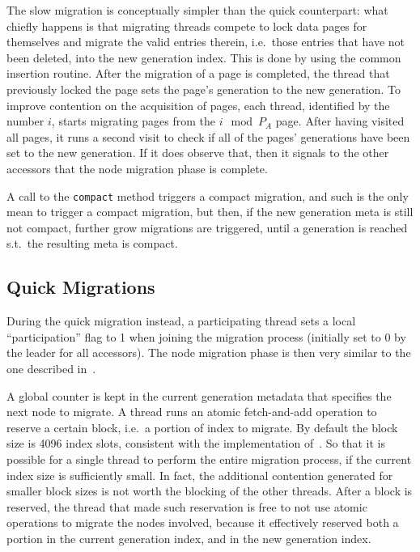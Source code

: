 The slow migration is conceptually simpler than the quick counterpart: what chiefly happens is that migrating threads compete to lock data pages for themselves and migrate the valid entries therein, i.e.\ those entries that have not been deleted, into the new generation index.
This is done by using the common insertion routine.
After the migration of a page is completed, the thread that previously locked the page sets the page's generation to the new generation.
To improve contention on the acquisition of pages, each thread, identified by the number $i$, starts migrating pages from the $i \mod P_A$ page.
After having visited all pages, it runs a second visit to check if all of the pages' generations have been set to the new generation.
If it does observe that, then it signals to the other accessors that the node migration phase is complete.

A call to the \texttt{compact} method triggers a compact migration, and such is the only mean to trigger a compact migration, but then, if the new generation meta is still not compact, further grow migrations are triggered, until a generation is reached s.t.\ the resulting meta is compact.


\subsection{Quick Migrations}\label{subsec:quick-migrations}
During the quick migration instead, a participating thread sets a local ``participation'' flag to 1 when joining the migration process (initially set to 0 by the leader for all accessors).
The node migration phase is then very similar to the one described in~\cite[\S5.3.1]{maier}.

A global counter is kept in the current generation metadata that specifies the next node to migrate.
A thread runs an atomic fetch-and-add operation to reserve a certain block, i.e.\ a portion of index to migrate.
By default the block size is 4096 index slots, consistent with the implementation of~\cite{maier}.
So that it is possible for a single thread to perform the entire migration process, if the current index size is sufficiently small.
In fact, the additional contention generated for smaller block sizes is not worth the blocking of the other threads.
After a block is reserved, the thread that made such reservation is free to not use atomic operations to migrate the nodes involved, because it effectively reserved both a portion in the current generation index, and in the new generation index.

